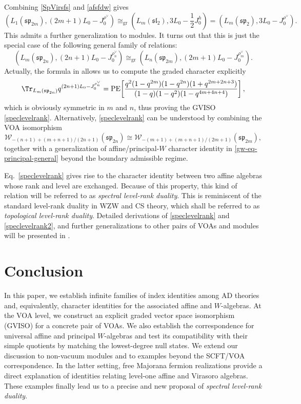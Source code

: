 \documentclass[a4paper,11pt]{article}
\theoremstyle{definition}
\theoremstyle{definition}
\theoremstyle{remark}
\newcommand{\be}{\begin{equation}}
\newcommand{\ee}{\end{equation}}
\begin{document}
Combining \eqref{SpVirsfs}  and \eqref{afsfdw}  gives
\be 
\left(L_1(\mathfrak{sp}_{2m} ),
(2m+1)L_0-J_0^{\rho^\vee}\right)
\cong_{\mathrm{gr}}
\left(L_m(\mathfrak{sl}_2 ),
3L_0-\frac12J^h_0\right)
=\left(L_m(\mathfrak{sp}_2 ),
3L_0-J_0^{\rho^\vee}\right).
\ee
This admits a further generalization to modules. It turns out that this is just the special case of the following general family of relations:
\be \label{speclevelrank}
 \left(L_m(\mathfrak{sp}_{2n}),
(2n+1)L_0-J_0^{\rho_n^\vee}\right)  \cong_{\mathrm{gr}}
\left(L_n(\mathfrak{sp}_{2m}),
(2m+1)L_0-J_0^{\rho_m^\vee}\right). 
\ee
Actually, the formula in \cite[Theorem~7.14]{ButoracWakimoto2024} allows us to compute the graded character explicitly
\be \label{speclevelrank2}  
\Tr_{L_m(\mathfrak{sp}_{2n})} q^{(2n+1)L_0-J_0^{\rho_n^\vee}}=
\operatorname{PE}\!\left[
\frac{q^2(1-q^{2m})(1-q^{2n})(1+q^{2m+2n+3})}
{(1-q)(1-q^2)(1-q^{4m+4n+4})}
\right],
\ee 
which is obviously symmetric in $m$ and $n$, thus proving the GVISO \eqref{speclevelrank}. 
Alternatively, \eqref{speclevelrank} can be understood by combining  the VOA isomorphism \cite[Theorem~9.3(2)]{Kanade:2018qut} 
\be 
\mathcal W_{-(n+1)+(m+n+1)/(2n+1)}(\mathfrak{sp}_{2n})
\cong
\mathcal W_{-(m+1)+(m+n+1)/(2m+1)}(\mathfrak{sp}_{2m}), 
\ee 
 together with a    generalization of affine/principal-$W$ character identity in \eqref{gw-eq-principal-general} beyond  the boundary admissible regime. 
  
   Eq.~\eqref{speclevelrank} gives rise to the character identity between two affine algebras whose rank and level are exchanged.  Because of this property, this kind of relation will be referred to as \emph{spectral level-rank duality}. This is  reminiscent of the  standard level-rank duality in WZW and CS theory, which shall be  referred to as \emph{topological level-rank duality}. Detailed derivations of \eqref{speclevelrank} and \eqref{speclevelrank2},  and further generalizations   to other pairs of VOAs and modules will be presented in \cite{Jiang2027}. 
 
 
 \section{Conclusion}\label{conssec}
 
 In this paper, we establish infinite families of index identities among AD theories and, equivalently, character identities for the associated affine and $W$-algebras. At the VOA level, we construct an explicit graded vector space isomorphism (GVISO) for a concrete pair of VOAs. We also establish the correspondence for universal affine and principal $W$-algebras and test its compatibility with their simple quotients by matching the lowest-degree null states. We extend our discussion to non-vacuum modules and to examples beyond the SCFT/VOA correspondence. In the latter setting, free Majorana fermion realizations provide a direct explanation of identities relating level-one affine and Virasoro algebras. These examples finally lead us to a precise and new  proposal of \emph{spectral level-rank duality}.
\end{document}
